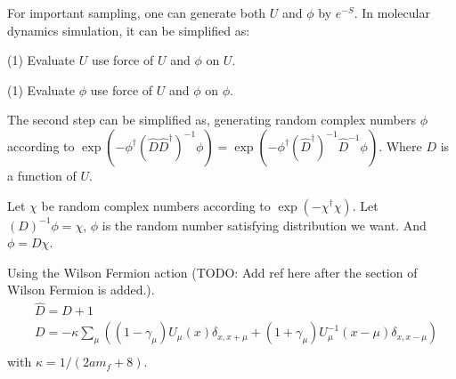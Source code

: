 For important sampling, one can generate both $U$ and $\phi$ by $e^{-S}$. In molecular dynamics simulation, it can be simplified as:

(1) Evaluate $U$ use force of $U$ and $\phi$ on $U$.

(1) Evaluate $\phi$ use force of $U$ and $\phi$ on $\phi$.

The second step can be simplified as, generating random complex numbers $\phi$ according to $\exp (-\phi^{\dagger} \left(\hat{D}\hat{D}^{\dagger}\right)^{-1}\phi)=\exp (-\phi^{\dagger}(\hat{D}^{\dagger})^{-1} \hat{D}^{-1}\phi)$. Where $D$ is a function of $U$.

Let $\chi$ be random complex numbers according to $\exp (-\chi ^{\dagger}\chi)$. Let $(D)^{-1}\phi=\chi$, $\phi$ is the random number satisfying distribution we want. And $\phi = D\chi$.

Using the Wilson Fermion action \textcolor[rgb]{0,0,1}{(TODO: Add ref here after the section of Wilson Fermion is added.)}.
\begin{equation}
\begin{split}
&\hat{D}=D+1\\
&D=-\kappa\sum _{\mu}\left((1-\gamma _{\mu})U_{\mu}(x)\delta _{x,x+\mu}+(1+\gamma _{\mu})U_{\mu}^{-1}(x-\mu)\delta _{x,x-\mu}\right)\\
\end{split}
\end{equation}
with $\kappa=1/(2am_f+8)$.

